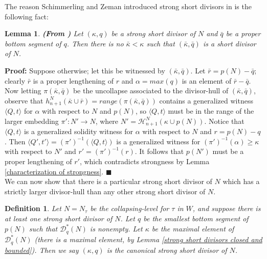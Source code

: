 \documentclass[12pt]{article}
\newtheorem{lem}[thm]{Lemma}
\newtheorem{defn}[thm]{Definition}
\begin{document}
The reason Schimmerling and Zeman introduced strong short divisors in \cite{zeman square proof} is the following fact:\\

\begin{lem} \label{strong short divisor has no short overlaps}
\textbf{(From \cite{zeman square proof})}
Let $(\kappa , q)$ be a strong short divisor of $N$ and $\bar{q}$ be a proper bottom segment of $q$.  Then there is no $\bar{\kappa} < \kappa$ such that $(\bar{\kappa} , \bar{q})$ is a short divisor of $N$.
\end{lem}

\textbf{Proof:}  Suppose otherwise; let this be witnessed by $(\bar{\kappa} , \bar{q})$.  Let $\bar{r} = p (N) - \bar{q}$; clearly $\bar{r}$ is a proper lengthening of $r$ and $\alpha = max (q)$ is an element of $\bar{r} - \bar{q}$.  Now letting $\pi (\bar{\kappa} , \bar{q})$ be the uncollapse associated to the divisor-hull of $(\bar{\kappa} , \bar{q})$, observe that $h_{n + 1}^N (\bar{\kappa} \cup \bar{r}) = range (\pi (\bar{\kappa} , \bar{q}))$ contains a generalized witness $\langle Q , t \rangle$ for $\alpha$ with respect to $N$ and $p(N)$, so $\langle Q , t \rangle$ must be in the range of the larger embedding $\pi' : N' \longrightarrow N$, where $N' = \mathcal{H}_{n+1}^N ( \kappa \cup p(N))$.  Notice that $\langle Q , t \rangle$ is a generalized solidity witness for $\alpha$ with respect to $N$ and $r = p(N) - q$.  Then $\langle Q' , t' \rangle = ( \pi')^{-1} ( \langle Q , t \rangle )$ is a generalized witness for $( \pi')^{-1} (\alpha ) \geq \kappa$ with respect to $N'$ and $r' = ( \pi')^{-1} (r)$.  It follows that $p(N')$ must be a proper lengthening of $r'$, which contradicts strongness by Lemma \ref{characterization of strongness}. $\blacksquare$\\

We can now show that there is a particular strong short divisor of $N$ which has a strictly larger divisor-hull than any other strong short divisor of $N$.\\

\begin{defn} \label{canonical short divisor}
Let $N = N_\tau$ be the collapsing-level for $\tau$ in $W$, and suppose there is at least one strong short divisor of $N$.  Let $q$ be the smallest bottom segment of $p(N)$ such that $\mathcal{D}^*_q (N)$ is nonempty.  Let $\kappa$ be the maximal element of $\mathcal{D}^*_q (N)$ (there is a maximal element, by Lemma \ref{strong short divisors closed and bounded}).  Then we say $(\kappa, q)$ is the canonical strong short divisor of $N$.
\end{defn}
\end{document}
